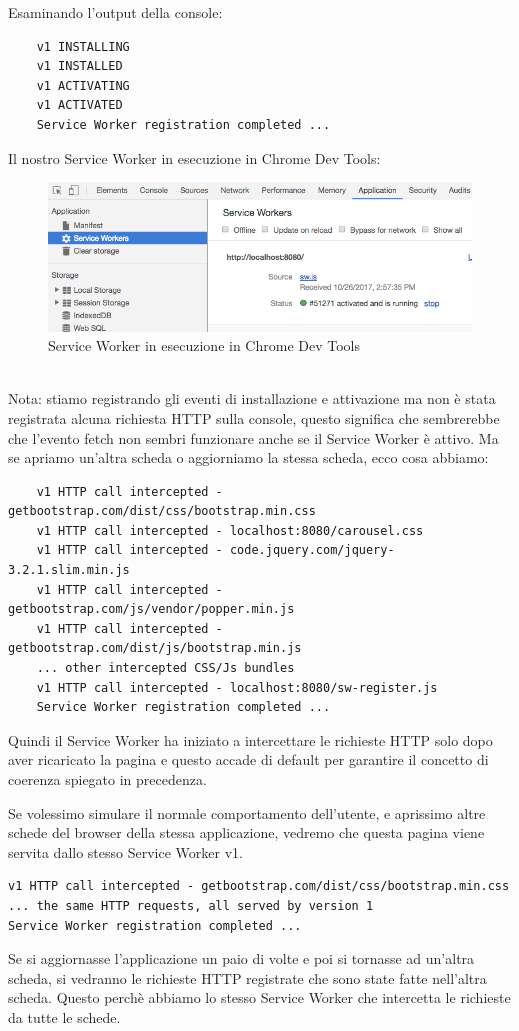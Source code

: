 \documentclass[italian]{article}
\begin{document}
Esaminando l'output della console:
\begin{lstlisting}
	v1 INSTALLING 
	v1 INSTALLED
	v1 ACTIVATING
	v1 ACTIVATED
	Service Worker registration completed ...
\end{lstlisting}
Il nostro Service Worker in esecuzione in Chrome Dev Tools:
\begin{figure}[h]
	\centering
	\includegraphics[width=1\linewidth]{DevTools}
	\caption{Service Worker in esecuzione in Chrome Dev Tools}
	\label{fig:Service Worker in esecuzione in Chrome Dev Tools}
\end{figure}\\
Nota: stiamo registrando gli eventi di installazione e attivazione ma non è stata registrata alcuna richiesta HTTP sulla console, questo significa che sembrerebbe che l'evento fetch non sembri funzionare anche se il Service Worker è attivo. Ma se apriamo un'altra scheda o aggiorniamo la stessa scheda, ecco cosa abbiamo:
\begin{lstlisting}
	v1 HTTP call intercepted - getbootstrap.com/dist/css/bootstrap.min.css
	v1 HTTP call intercepted - localhost:8080/carousel.css
	v1 HTTP call intercepted - code.jquery.com/jquery-3.2.1.slim.min.js
	v1 HTTP call intercepted - getbootstrap.com/js/vendor/popper.min.js
	v1 HTTP call intercepted - getbootstrap.com/dist/js/bootstrap.min.js
	... other intercepted CSS/Js bundles
	v1 HTTP call intercepted - localhost:8080/sw-register.js
	Service Worker registration completed ...
\end{lstlisting}
Quindi il Service Worker ha iniziato a intercettare le richieste HTTP solo dopo aver ricaricato la pagina e questo accade di default per garantire il concetto di coerenza spiegato in precedenza.

Se volessimo simulare il normale comportamento dell'utente, e aprissimo altre schede del browser della stessa applicazione, vedremo che questa pagina viene servita dallo stesso Service Worker v1.
\begin{lstlisting}
v1 HTTP call intercepted - getbootstrap.com/dist/css/bootstrap.min.css
... the same HTTP requests, all served by version 1
Service Worker registration completed ...
\end{lstlisting}
Se si aggiornasse l'applicazione un paio di volte e poi si tornasse ad un'altra scheda, si vedranno le richieste HTTP registrate che sono state fatte nell'altra scheda. Questo perchè abbiamo lo stesso Service Worker che intercetta le richieste da tutte le schede.
\end{document}
